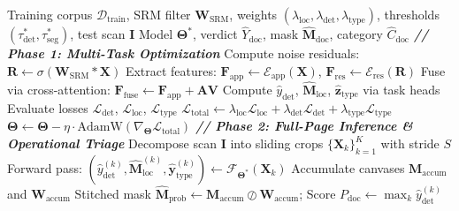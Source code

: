 \documentclass[pdflatex,sn-mathphys-num,iicol]{sn-jnl}
\begin{document}
\begin{algorithm}[!t]
\caption{ForgeryNet Learning and Operational Triage}\label{alg:forgerynet}
\begin{algorithmic}[1]
\Require Training corpus $\mathcal{D}_{\text{train}}$, SRM filter $\mathbf{W}_{\text{SRM}}$, weights $(\lambda_{\text{loc}}, \lambda_{\text{det}}, \lambda_{\text{type}})$, thresholds $(\tau_{\text{det}}^*, \tau_{\text{seg}}^*)$, test scan $\mathbf{I}$
\Ensure Model $\boldsymbol{\Theta}^*$, verdict $\hat{Y}_{\text{doc}}$, mask $\hat{\mathbf{M}}_{\text{doc}}$, category $\hat{C}_{\text{doc}}$
\Statex \textbf{\textit{// Phase 1: Multi-Task Optimization}}
        \State Compute noise residuals: $\mathbf{R} \leftarrow \sigma(\mathbf{W}_{\text{SRM}} * \mathbf{X})$ 
        \State Extract features: $\mathbf{F}_{\text{app}} \leftarrow \mathcal{E}_{\text{app}}(\mathbf{X})$, $\mathbf{F}_{\text{res}} \leftarrow \mathcal{E}_{\text{res}}(\mathbf{R})$
        \State Fuse via cross-attention: $\mathbf{F}_{\text{fuse}} \leftarrow \mathbf{F}_{\text{app}} + \mathbf{A}\mathbf{V}$ 
        \State Compute $\hat{y}_{\text{det}}$, $\hat{\mathbf{M}}_{\text{loc}}$, $\hat{\mathbf{z}}_{\text{type}}$ via task heads 
        \State Evaluate losses $\mathcal{L}_{\text{det}}$, $\mathcal{L}_{\text{loc}}$, $\mathcal{L}_{\text{type}}$ 
        \State $\mathcal{L}_{\text{total}} \leftarrow \lambda_{\text{loc}}\mathcal{L}_{\text{loc}} + \lambda_{\text{det}}\mathcal{L}_{\text{det}} + \lambda_{\text{type}}\mathcal{L}_{\text{type}}$
        \State $\boldsymbol{\Theta} \leftarrow \boldsymbol{\Theta} - \eta \cdot \text{AdamW}(\nabla_{\boldsymbol{\Theta}} \mathcal{L}_{\text{total}})$
    \EndFor
\EndFor
\Statex \textbf{\textit{// Phase 2: Full-Page Inference \& Operational Triage}}
\State Decompose scan $\mathbf{I}$ into sliding crops $\{\mathbf{X}_k\}_{k=1}^K$ with stride $S$
    \State Forward pass: $(\hat{y}_{\text{det}}^{(k)}, \hat{\mathbf{M}}_{\text{loc}}^{(k)}, \hat{\mathbf{y}}_{\text{type}}^{(k)}) \leftarrow \mathcal{F}_{\boldsymbol{\Theta}^*}(\mathbf{X}_k)$
    \State Accumulate canvases $\mathbf{M}_{\text{accum}}$ and $\mathbf{W}_{\text{accum}}$
\EndFor
\State Stitched mask $\hat{\mathbf{M}}_{\text{prob}} \leftarrow \mathbf{M}_{\text{accum}} \oslash \mathbf{W}_{\text{accum}}$; Score $P_{\text{doc}} \leftarrow \max_k \hat{y}_{\text{det}}^{(k)}$

\end{algorithmic}
\end{algorithm}
\end{document}
